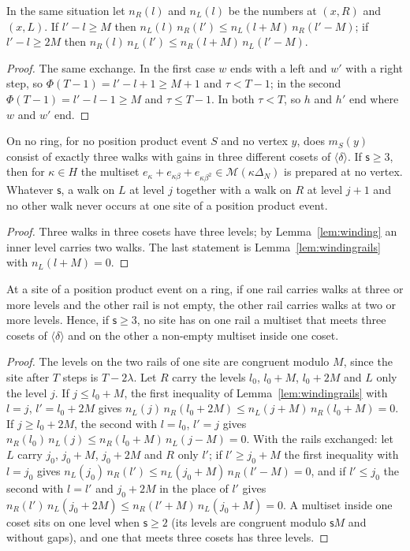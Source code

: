 \begin{lemma}\label{lem:windingrails}
In the same situation let $n_R(l)$ and $n_L(l)$ be the numbers at $(x,R)$ and $(x,L)$. If $l'-l\ge M$ then $n_L(l)\,n_R(l')\le n_L(l+M)\,n_R(l'-M)$; if $l'-l\ge2M$ then $n_R(l)\,n_L(l')\le n_R(l+M)\,n_L(l'-M)$.
\end{lemma}
\begin{proof}
The same exchange. In the first case $w$ ends with a left and $w'$ with a right step, so $\Phi(T-1)=l'-l+1\ge M+1$ and $\tau<T-1$; in the second $\Phi(T-1)=l'-l-1\ge M$ and $\tau\le T-1$. In both $\tau<T$, so $h$ and $h'$ end where $w$ and $w'$ end.
\end{proof}

\begin{corollary}\label{cor:nowind}
On no ring, for no position product event $S$ and no vertex $y$, does $m_S(y)$ consist of exactly three walks with gains in three different cosets of $\langle\delta\rangle$. If $\mathsf{s}\ge3$, then for $\kappa\in H$ the multiset $e_\kappa+e_{\kappa\beta}+e_{\kappa\beta^{2}}\in\mathcal{M}(\kappa\Delta_N)$ is prepared at no vertex. Whatever $\mathsf{s}$, a walk on $L$ at level $j$ together with a walk on $R$ at level $j+1$ and no other walk never occurs at one site of a position product event.
\end{corollary}
\begin{proof}
Three walks in three cosets have three levels; by Lemma~\ref{lem:winding} an inner level carries two walks. The last statement is Lemma~\ref{lem:windingrails} with $n_L(l+M)=0$.
\end{proof}

\begin{corollary}\label{cor:threetwo}
At a site of a position product event on a ring, if one rail carries walks at three or more levels and the other rail is not empty, the other rail carries walks at two or more levels. Hence, if $\mathsf{s}\ge3$, no site has on one rail a multiset that meets three cosets of $\langle\delta\rangle$ and on the other a non-empty multiset inside one coset.
\end{corollary}
\begin{proof}
The levels on the two rails of one site are congruent modulo $M$, since the site after $T$ steps is $T-2\lambda$. Let $R$ carry the levels $l_0$, $l_0+M$, $l_0+2M$ and $L$ only the level $j$. If $j\le l_0+M$, the first inequality of Lemma~\ref{lem:windingrails} with $l=j$, $l'=l_0+2M$ gives $n_L(j)\,n_R(l_0+2M)\le n_L(j+M)\,n_R(l_0+M)=0$. If $j\ge l_0+2M$, the second with $l=l_0$, $l'=j$ gives $n_R(l_0)\,n_L(j)\le n_R(l_0+M)\,n_L(j-M)=0$. With the rails exchanged: let $L$ carry $j_0$, $j_0+M$, $j_0+2M$ and $R$ only $l'$; if $l'\ge j_0+M$ the first inequality with $l=j_0$ gives $n_L(j_0)\,n_R(l')\le n_L(j_0+M)\,n_R(l'-M)=0$, and if $l'\le j_0$ the second with $l=l'$ and $j_0+2M$ in the place of $l'$ gives $n_R(l')\,n_L(j_0+2M)\le n_R(l'+M)\,n_L(j_0+M)=0$. A multiset inside one coset sits on one level when $\mathsf{s}\ge2$ (its levels are congruent modulo $\mathsf{s}M$ and without gaps), and one that meets three cosets has three levels.
\end{proof}

